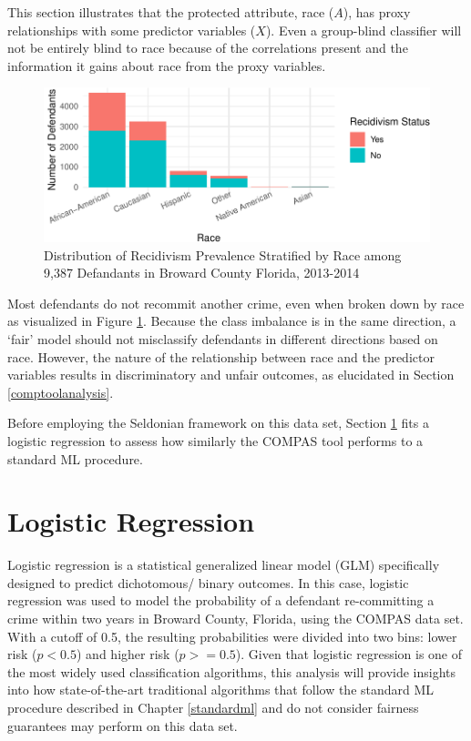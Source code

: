 \documentclass[12pt, twoside]{amherstthesis}
\begin{document}
This section illustrates that the protected attribute, race (\(A\)), has proxy relationships with some predictor variables (\(X\)). Even a group-blind classifier will not be entirely blind to race because of the correlations present and the information it gains about race from the proxy variables.
\begin{figure}

{\centering \includegraphics{Dasha-Asienga_StatThesis_files/figure-latex/ch3fig13-1} 

}

\caption{Distribution of Recidivism Prevalence Stratified by Race among 9,387 Defandants in Broward County Florida, 2013-2014}\label{fig:ch3fig13}
\end{figure}
Most defendants do not recommit another crime, even when broken down by race as visualized in Figure \ref{fig:ch3fig13}. Because the class imbalance is in the same direction, a `fair' model should not misclassify defendants in different directions based on race. However, the nature of the relationship between race and the predictor variables results in discriminatory and unfair outcomes, as elucidated in Section \ref{comptoolanalysis}.

Before employing the Seldonian framework on this data set, Section \ref{logreg} fits a logistic regression to assess how similarly the COMPAS tool performs to a standard ML procedure.

\hypertarget{logreg}{%
\section{Logistic Regression}\label{logreg}}

Logistic regression is a statistical generalized linear model (GLM) specifically designed to predict dichotomous/ binary outcomes. In this case, logistic regression was used to model the probability of a defendant re-committing a crime within two years in Broward County, Florida, using the COMPAS data set. With a cutoff of 0.5, the resulting probabilities were divided into two bins: lower risk (\(p < 0.5\)) and higher risk (\(p >= 0.5\)). Given that logistic regression is one of the most widely used classification algorithms, this analysis will provide insights into how state-of-the-art traditional algorithms that follow the standard ML procedure described in Chapter \ref{standardml} and do not consider fairness guarantees may perform on this data set.
\end{document}
